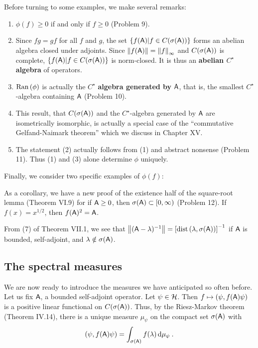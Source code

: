 Before turning to some examples, we make several remarks:
\begin{enumerate}
    \item $\phi(f) \geq 0$ if and only if $f \geq 0$ (Problem 9).
    
    \item Since $fg = gf$ for all $f$ and $g$, the set $\left \lbrace f(\mathsf{A}) | f \in C(\sigma(\mathsf{A})) \right \rbrace$ forms an abelian algebra closed under adjoints. Since $\left \Vert f(\mathsf{A}) \right \Vert = \left \Vert f \right \Vert_\infty$ and $C(\sigma( \mathsf{A}))$ is complete, $\left \lbrace f(\mathsf{A}) | f \in C(\sigma(\mathsf{A})) \right \rbrace$ is norm-closed. It is thus an \textbf{abelian $C^\star$ algebra} of operators. 
    \item $\mathrm{Ran}\, (\phi)$ is actually the $C^\star$ \textbf{algebra generated by} $\mathsf{A}$, that is, the smallest $C^\star$-algebra containing $\mathsf{A}$ (Problem 10).
    \item This result, that $C(\sigma (\mathsf{A}))$ and the $C^\star$-algebra generated by $\mathsf{A}$ are isometrically isomorphic, is actually a special case of the \enquote{commutative Gelfand-Naimark theorem} which we discuss in Chapter XV.
    \item The statement (2) actually follows from (1) and abstract nonsense (Problem 11). Thus (1) and (3) alone determine $\phi$ uniquely.
    
\end{enumerate}

Finally, we consider two specific examples of $\phi(f)$:

\begin{example}
    As a corollary, we have a new proof of the existence half of the square-root lemma (Theorem VI.9) for if $\mathsf{A} \geq 0$, then $\sigma (\mathsf{A}) \subset  [0, \infty)$ (Problem 12). If $f(x) = x^{1/2}$, then $f(\mathsf{A})^2 = \mathsf{A}$.
\end{example}

\begin{example}
    From (7) of Theorem VII.1, we see that $\left \Vert (\mathsf{A} - \lambda)^{-1} \right \Vert = \left[ \mathrm{dist}\, (\lambda, \sigma(\mathsf{A})) \right]^{-1}$ if $\mathsf{A}$ is bounded, self-adjoint, and $\lambda \notin \sigma(\mathsf{A})$.
\end{example}

\subsection{The spectral measures}

We are now ready to introduce the measures we have anticipated so often before. Let us fix $\mathsf{A}$, a bounded self-adjoint operator. Let $\psi \in \mathcal{H}$. 
Then $f \mapsto (\psi, f(\mathsf{A}) \psi)$ is a positive linear functional on $C(\sigma(\mathsf{A}))$. Thus, by the Riesz-Markov theorem (Theorem IV.14), there is a unique measure $\mu_\psi$ on the compact set $\sigma(\mathsf{A})$ with 
\begin{align}
    (\psi, f(\mathsf{A}) \psi) = \int_{\sigma (\mathsf{A})} f(\lambda) \, \mathrm{d} \mu_\psi \:.
\end{align}

